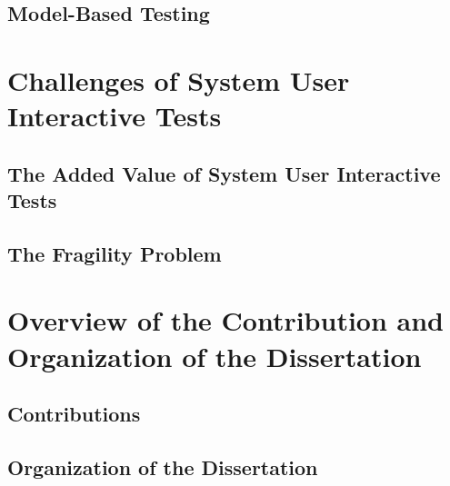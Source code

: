 \subsection{Model-Based Testing}

\section{Challenges of System User Interactive Tests}

\subsection{The Added Value of System User Interactive Tests}

\subsection{The Fragility Problem}

\section{Overview of the Contribution and Organization of the Dissertation}
\subsection{Contributions}
\subsection{Organization of the Dissertation}